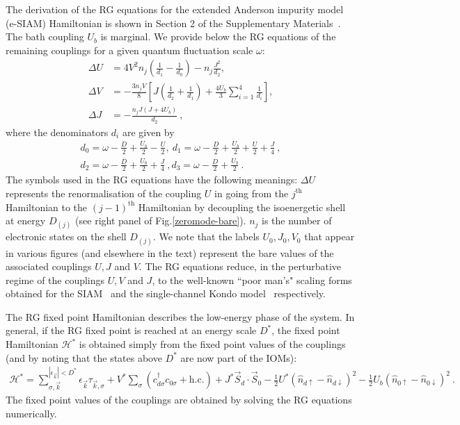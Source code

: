 \documentclass{iopart}
\begin{document}
The derivation of the RG equations for the extended Anderson impurity model (e-SIAM) Hamiltonian is shown in Section 2 of the Supplementary Materials~\cite{supp_mat}. The bath coupling \(U_b\) is marginal. We provide below the RG equations of the remaining couplings for a given quantum fluctuation scale \(\omega\):
\begin{eqnarray}
	\Delta U &= 4V^2 n_j\left(\frac{1}{d_1} - \frac{1}{d_0}\right) - n_j\frac{J^2}{d_2},\\
	\Delta V &= -\frac{3n_j V}{8}\left[J\left(\frac{1}{d_2} + \frac{1}{d_1}\right) +  \frac{4U_b}{3}\sum_{i=1}^4 \frac{1}{d_i}\right],\nonumber \\
	\Delta J &= -\frac{n_j J\left(J + 4U_b\right)}{d_2}~,\label{rg-eqn}
\end{eqnarray}
where the denominators \(d_i\) are given by
\begin{eqnarray}\label{rg-eqtn1}
	d_0 = \omega - \frac{D}{2} + \frac{U_b}{2} - \frac{U}{2},~d_1 = \omega - \frac{D}{2} + \frac{U_b}{2} + \frac{U}{2} + \frac{J}{4}~,\\
	d_2 = \omega - \frac{D}{2} + \frac{U_b}{2} + \frac{J}{4}~,d_3 = \omega - \frac{D}{2} + \frac{U_b}{2}~.
\end{eqnarray}
The symbols used in the RG equations have the following meanings: \(\Delta U\) represents the renormalisation of the coupling \(U\) in going from the \(j^\text{th}\) Hamiltonian to the \(\left( j-1 \right) ^\text{th}\) Hamiltonian by decoupling the isoenergetic shell at energy \(D_{(j)}\) (see right panel of Fig.\eqref{zeromode-bare}). \(n_j\) is the number of electronic states on the shell \(D_{(j)}\). We note that the labels \(U_0,J_0,V_0\) that appear in various figures (and elsewhere in the text) represent the bare values of the associated couplings \(U,J\) and \(V\). The RG equations reduce, in the perturbative regime of the couplings $U, V$ and $J$, to the well-known ``poor man's" scaling forms obtained for the  SIAM~\cite{haldane1978scaling} and the single-channel Kondo model~\cite{anderson1970} respectively.

 The RG fixed point Hamiltonian describes the low-energy phase of the system. In general, if the RG fixed point is reached at an energy scale \(D^*\), the fixed point Hamiltonian \(\mathcal{H}^*\) is obtained simply from the fixed point values of the couplings (and by noting that the states above \(D^*\) are now part of the IOMs):
\begin{eqnarray}
	\label{fixed-point-ham}
	\mathcal{H}^* = \sum_{\sigma,\vec k}^{|\epsilon_{\vec k}| < D^*} \epsilon_{\vec k} \tau_{\vec k,\sigma} + V^*\sum_\sigma \left( c^\dagger_{d\sigma}c_{0\sigma} + \text{h.c.}\right) + J^* \vec{S}_d\cdot\vec{S}_0\nonumber - \frac{1}{2}U^*\left(\hat n_{d \uparrow} - \hat n_{d \downarrow}\right)^2 - \frac{1}{2}U_b \left(\hat n_{0 \uparrow} - \hat n_{0 \downarrow}\right)^2~.
\end{eqnarray}
The fixed point values of the couplings are obtained by solving the RG equations numerically.
\end{document}
